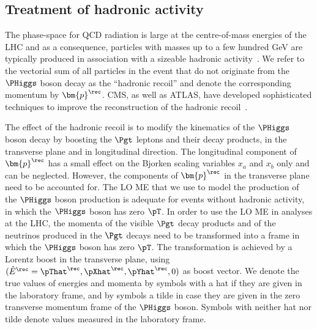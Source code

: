 \subsection{Treatment of hadronic activity}
\label{sec:mem_hadRecoil}

The phase-space for QCD radiation is large at the centre-of-mass
energies of the LHC
and as a consequence, particles with masses up to a few hundred GeV 
are typically produced in association with a sizeable hadronic activity~\cite{Alwall:2010cq}.
We refer to the vectorial sum of all particles in the event that do not originate from the $\PHiggs$ boson decay
as the ``hadronic recoil'' and denote the corresponding momentum by $\bm{p}^{\rec}$.
CMS, as well as ATLAS, have developed sophisticated techniques to improve the reconstruction 
of the hadronic recoil~\cite{CMS-JME-13-003,ATLAS-CONF-2014-019}.

The effect of the hadronic recoil is to modify the kinematics of the $\PHiggs$ boson decay
by boosting the $\Pgt$ leptons and their decay products,
in the transverse plane and in longitudinal direction.
The longitudinal component of $\bm{p}^{\rec}$ has a small effect on 
the Bjorken scaling variables $x_{a}$ and $x_{b}$ only and can be neglected.
However, the components of $\bm{p}^{\rec}$ in the transverse plane need to be accounted for.
The LO ME that we use to model the production of the $\PHiggs$ boson production 
is adequate for events without hadronic activity,
in which the $\PHiggs$ boson has zero $\pT$.
In order to use the LO ME in analyses at the LHC,
the momenta of the visible $\Pgt$ decay products and of the neutrinos produced in the $\Pgt$ decays
need to be transformed into a frame in which the $\PHiggs$ boson has zero $\pT$.
The transformation is achieved by a Lorentz boost in the transverse plane,
using $(\hat{E}^{\rec} = \pThat^{\rec}, \pXhat^{\rec}, \pYhat^{\rec}, 0)$ as boost
vector.
We denote the true values of energies and momenta by symbols with a
hat if they are given in the laboratory frame, and by symbols a tilde in case they are given in the zero transverse momentum frame of the $\PHiggs$ boson.
Symbols with neither hat nor tilde denote values measured in the
laboratory frame.

